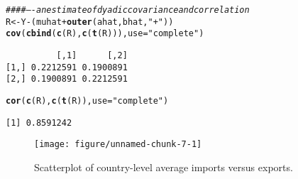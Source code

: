 \documentclass[11pt]{article}\usepackage[]{graphicx}\usepackage[]{color}
\makeatletter
\newcommand{\hlstr}[1]{\textcolor[rgb]{0.192,0.494,0.8}{#1}}%
\newcommand{\hlcom}[1]{\textcolor[rgb]{0.678,0.584,0.686}{\textit{#1}}}%
\newcommand{\hlopt}[1]{\textcolor[rgb]{0,0,0}{#1}}%
\newcommand{\hlstd}[1]{\textcolor[rgb]{0.345,0.345,0.345}{#1}}%
\newcommand{\hlkwb}[1]{\textcolor[rgb]{0.69,0.353,0.396}{#1}}%
\newcommand{\hlkwc}[1]{\textcolor[rgb]{0.333,0.667,0.333}{#1}}%
\newcommand{\hlkwd}[1]{\textcolor[rgb]{0.737,0.353,0.396}{\textbf{#1}}}%
\newenvironment{kframe}{%
 \def\at@end@of@kframe{}%
 \ifinner\ifhmode%
  \def\at@end@of@kframe{\end{minipage}}%
  \begin{minipage}{\columnwidth}%
 \fi\fi%
 \def\FrameCommand##1{\hskip\@totalleftmargin \hskip-\fboxsep
 \colorbox{shadecolor}{##1}\hskip-\fboxsep
     \hskip-\linewidth \hskip-\@totalleftmargin \hskip\columnwidth}%
 \MakeFramed {\advance\hsize-\width
   \@totalleftmargin\z@ \linewidth\hsize
   \@setminipage}}%
 {\par\unskip\endMakeFramed%
 \at@end@of@kframe}
\newenvironment{knitrout}{}{} %
\makeatother
\begin{document}
\begin{knitrout}\footnotesize
{}\color{fgcolor}\begin{kframe}
\begin{alltt}
\hlcom{#### ---- an estimate of dyadic covariance and correlation}
\hlstd{R} \hlkwb{<-} \hlstd{Y} \hlopt{-} \hlstd{( muhat} \hlopt{+} \hlkwd{outer}\hlstd{(ahat,bhat,}\hlstr{"+"}\hlstd{) )}
\hlkwd{cov}\hlstd{(} \hlkwd{cbind}\hlstd{(} \hlkwd{c}\hlstd{(R),}\hlkwd{c}\hlstd{(}\hlkwd{t}\hlstd{(R)) ),}\hlkwc{use}\hlstd{=}\hlstr{"complete"}\hlstd{)}
\end{alltt}
\begin{verbatim}
          [,1]      [,2]
[1,] 0.2212591 0.1900891
[2,] 0.1900891 0.2212591
\end{verbatim}
\begin{alltt}
\hlkwd{cor}\hlstd{(} \hlkwd{c}\hlstd{(R),}\hlkwd{c}\hlstd{(}\hlkwd{t}\hlstd{(R)),}\hlkwc{use}\hlstd{=}\hlstr{"complete"}\hlstd{)}
\end{alltt}
\begin{verbatim}
[1] 0.8591242
\end{verbatim}
\end{kframe}
\end{knitrout}

\begin{figure}
\begin{knitrout}\footnotesize
{}\color{fgcolor}

{\centering \texttt{[image: figure/unnamed-chunk-7-1]} 

}



\end{knitrout}
\caption{Scatterplot of country-level average imports versus exports.} 
\label{fig:trade_rmvcm}
\end{figure}
\end{document}
